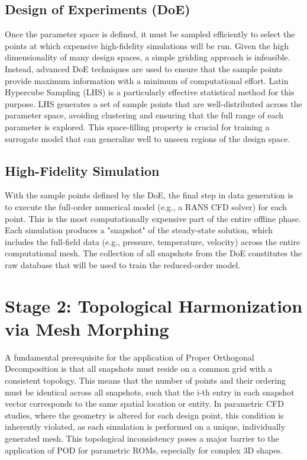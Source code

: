 \documentclass[dscexam, EN]{ufabcFHZh}
\begin{document}
\subsection{Design of Experiments (DoE)}

Once the parameter space is defined, it must be sampled efficiently to select the points at which expensive high-fidelity simulations will be run. Given the high dimensionality of many design spaces, a simple gridding approach is infeasible. Instead, advanced DoE techniques are used to ensure that the sample points provide maximum information with a minimum of computational effort. Latin Hypercube Sampling (LHS) is a particularly effective statistical method for this purpose. LHS generates a set of sample points that are well-distributed across the parameter space, avoiding clustering and ensuring that the full range of each parameter is explored. This space-filling property is crucial for training a surrogate model that can generalize well to unseen regions of the design space.

\subsection{High-Fidelity Simulation}

With the sample points defined by the DoE, the final step in data generation is to execute the full-order numerical model (e.g., a RANS CFD solver) for each point. This is the most computationally expensive part of the entire offline phase. Each simulation produces a "snapshot" of the steady-state solution, which includes the full-field data (e.g., pressure, temperature, velocity) across the entire computational mesh. The collection of all snapshots from the DoE constitutes the raw database that will be used to train the reduced-order model. 

\section{Stage 2: Topological Harmonization via Mesh Morphing}

A fundamental prerequisite for the application of Proper Orthogonal Decomposition is that all snapshots must reside on a common grid with a consistent topology. This means that the number of points and their ordering must be identical across all snapshots, such that the i-th entry in each snapshot vector corresponds to the same spatial location or entity. In parametric CFD studies, where the geometry is altered for each design point, this condition is inherently violated, as each simulation is performed on a unique, individually generated mesh. This topological inconsistency poses a major barrier to the application of POD for parametric ROMs, especially for complex 3D shapes. 
\end{document}
